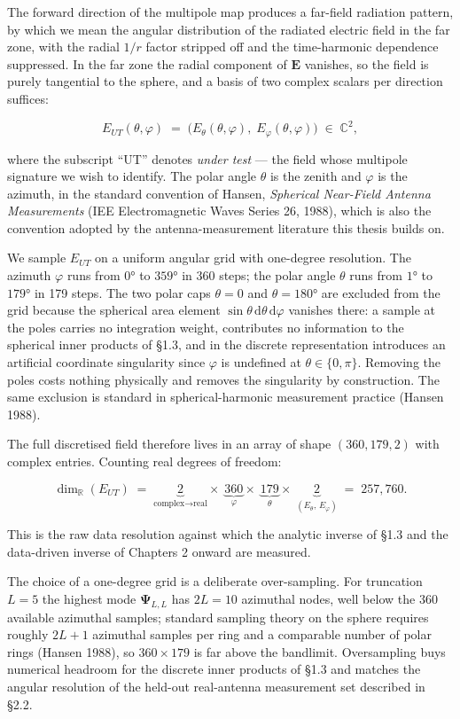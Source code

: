 \documentclass[
  english,
  11pt,
]{report}
\begin{document}
The forward direction of the multipole map produces a far-field
radiation pattern, by which we mean the angular distribution of the
radiated electric field in the far zone, with the radial \(1/r\) factor
stripped off and the time-harmonic dependence suppressed. In the far
zone the radial component of \(\mathbf E\) vanishes, so the field is
purely tangential to the sphere, and a basis of two complex scalars per
direction suffices:

\[
E_{UT}(\theta,\varphi) \;=\;\bigl(E_\theta(\theta,\varphi),\; E_\varphi(\theta,\varphi)\bigr) \;\in\; \mathbb{C}^2,
\]

where the subscript ``UT'' denotes \emph{under test} --- the field whose
multipole signature we wish to identify. The polar angle \(\theta\) is
the zenith and \(\varphi\) is the azimuth, in the standard convention of
Hansen, \emph{Spherical Near-Field Antenna Measurements} (IEE
Electromagnetic Waves Series 26, 1988), which is also the convention
adopted by the antenna-measurement literature this thesis builds on.

We sample \(E_{UT}\) on a uniform angular grid with one-degree
resolution. The azimuth \(\varphi\) runs from \(0°\) to \(359°\) in 360
steps; the polar angle \(\theta\) runs from \(1°\) to \(179°\) in 179
steps. The two polar caps \(\theta=0\) and \(\theta=180°\) are excluded
from the grid because the spherical area element
\(\sin\theta\,\mathrm{d}\theta\,\mathrm{d}\varphi\) vanishes there: a
sample at the poles carries no integration weight, contributes no
information to the spherical inner products of §1.3, and in the discrete
representation introduces an artificial coordinate singularity since
\(\varphi\) is undefined at \(\theta\in\{0,\pi\}\). Removing the poles
costs nothing physically and removes the singularity by construction.
The same exclusion is standard in spherical-harmonic measurement
practice (Hansen 1988).

The full discretised field therefore lives in an array of shape
\((360, 179, 2)\) with complex entries. Counting real degrees of
freedom:

\[
\dim_{\mathbb R}(E_{UT}) \;=\; \underbrace{2}_{\text{complex} \to \text{real}} \times\; \underbrace{360}_{\varphi}\times\; \underbrace{179}_{\theta}\times\; \underbrace{2}_{(E_\theta,\,E_\varphi)} \;=\; 257{,}760.
\]

This is the raw data resolution against which the analytic inverse of
§1.3 and the data-driven inverse of Chapters 2 onward are measured.

The choice of a one-degree grid is a deliberate over-sampling. For
truncation \(L=5\) the highest mode \(\boldsymbol{\Psi}_{L,L}\) has
\(2L=10\) azimuthal nodes, well below the \(360\) available azimuthal
samples; standard sampling theory on the sphere requires roughly
\(2L+1\) azimuthal samples per ring and a comparable number of polar
rings (Hansen 1988), so \(360 \times 179\) is far above the bandlimit.
Oversampling buys numerical headroom for the discrete inner products of
§1.3 and matches the angular resolution of the held-out real-antenna
measurement set described in §2.2.
\end{document}
